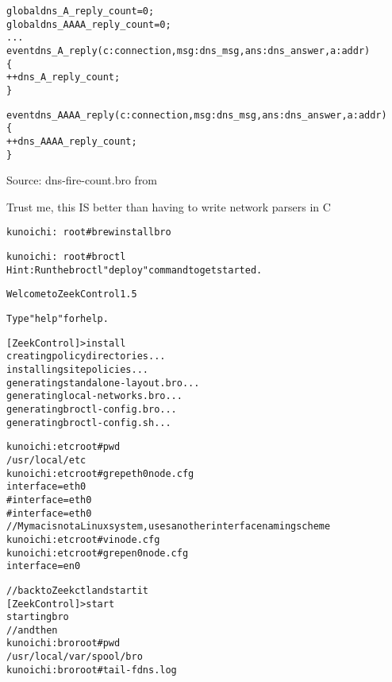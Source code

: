 \documentclass[20pt,landscape,a4paper,footrule]{foils}
\begin{document}

\begin{alltt}\small
global dns_A_reply_count=0;
global dns_AAAA_reply_count=0;
...
event dns_A_reply(c: connection, msg: dns_msg, ans: dns_answer, a: addr)
	\{
	++dns_A_reply_count;
	\}

event dns_AAAA_reply(c: connection, msg: dns_msg, ans: dns_answer, a: addr)
	\{
	++dns_AAAA_reply_count;
	\}
\end{alltt}

Source: dns-fire-count.bro from\\
{\small {}}

Trust me, this IS better than having to write network parsers in C \smiley




\begin{alltt}\small
kunoichi:~ root# brew install bro

kunoichi:~ root# broctl
Hint: Run the broctl "deploy" command to get started.

Welcome to ZeekControl 1.5

Type "help" for help.

[ZeekControl] > install
creating policy directories ...
installing site policies ...
generating standalone-layout.bro ...
generating local-networks.bro ...
generating broctl-config.bro ...
generating broctl-config.sh ...
\end{alltt}


\begin{alltt}\small
kunoichi:etc root# pwd
/usr/local/etc
kunoichi:etc root# grep eth0 node.cfg
interface=eth0
#interface=eth0
#interface=eth0
// My mac is not a Linux system, uses another interface naming scheme
kunoichi:etc root# vi node.cfg
kunoichi:etc root# grep en0 node.cfg
interface=en0
\end{alltt}


\begin{alltt}\small
// back to Zeekctl and start it
[ZeekControl] > start
starting bro
// and then
kunoichi:bro root# pwd
/usr/local/var/spool/bro
kunoichi:bro root# tail -f dns.log
\end{alltt}
\end{document}
